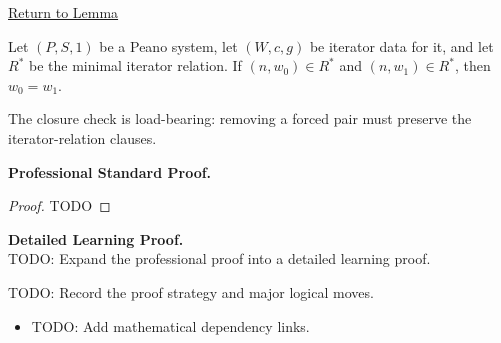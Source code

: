 \newpage
{}
\label{prf:forced-values-are-unique}

\begin{remark*}[Return]
\hyperref[lem:forced-values-are-unique]{Return to Lemma}
\end{remark*}

\begin{theorem*}
Let $(P,S,1)$ be a Peano system, let $(W,c,g)$ be iterator data for it, and let
$R^*$ be the minimal iterator relation. If $(n,w_0)\in R^*$ and
$(n,w_1)\in R^*$, then $w_0=w_1$.
\end{theorem*}

\begin{remark*}
The closure check is load-bearing: removing a forced pair must preserve the
iterator-relation clauses.
\end{remark*}

\textbf{Professional Standard Proof.}~\\
\begin{proof}
TODO
\end{proof}

\textbf{Detailed Learning Proof.}~\\
TODO: Expand the professional proof into a detailed learning proof.

\begin{remark*}
TODO: Record the proof strategy and major logical moves.
\end{remark*}

\begin{dependencies}
\begin{itemize}
  \item TODO: Add mathematical dependency links.
\end{itemize}
\end{dependencies}

